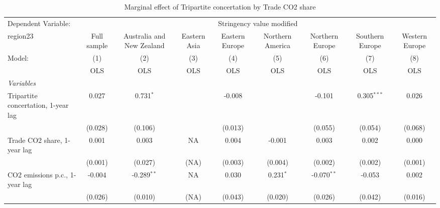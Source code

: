 
\begin{table}[htbp]
   \caption{Marginal effect of Tripartite concertation by Trade CO2 share}
   \centering
   \begin{tabular}{lcccccccc}
      \toprule
      Dependent Variable: & \multicolumn{8}{c}{Stringency value modified}\\
      region23                                                          & Full sample    & Australia and New Zealand & Eastern Asia & Eastern Europe & Northern America & Northern Europe & Southern Europe & Western Europe \\   
      Model:                                                            & (1)            & (2)                       & (3)          & (4)            & (5)              & (6)             & (7)             & (8)\\  
                                                                        &  OLS           & OLS                       & OLS          & OLS            & OLS              & OLS             & OLS             & OLS\\  
      \midrule
      \emph{Variables}\\
      Tripartite concertation, 1-year lag                               & 0.027          & 0.731$^{*}$               &              & -0.008         &                  & -0.101          & 0.305$^{***}$   & 0.026\\   
                                                                        & (0.028)        & (0.106)                   &              & (0.013)        &                  & (0.055)         & (0.054)         & (0.068)\\   
      Trade CO2 share, 1-year lag                                       & 0.001          & 0.003                     & NA           & 0.004          & -0.001           & 0.003           & 0.002           & 0.000\\   
                                                                        & (0.001)        & (0.027)                   & (NA)         & (0.003)        & (0.004)          & (0.002)         & (0.002)         & (0.001)\\   
      CO2 emissions p.c., 1-year lag                                    & -0.004         & -0.289$^{**}$             & NA           & 0.030          & 0.231$^{*}$      & -0.070$^{**}$   & -0.053          & 0.002\\   
                                                                        & (0.026)        & (0.010)                   & (NA)         & (0.043)        & (0.020)          & (0.026)         & (0.042)         & (0.016)\\   

\end{tabular}
\end{table}
